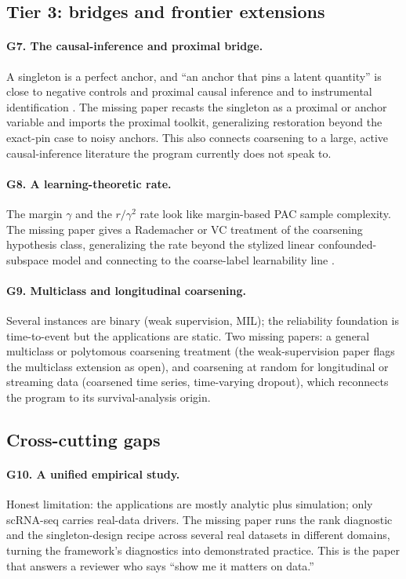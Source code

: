 \documentclass[11pt]{article}
\begin{document}
\subsection{Tier 3: bridges and frontier extensions}

\paragraph{G7. The causal-inference and proximal bridge.}
A singleton is a perfect anchor, and ``an anchor that pins a latent quantity'' is
close to negative controls and proximal causal inference \citep{miao2018identifying}
and to instrumental identification \citep{neweypowell2003instrumental}. The missing
paper recasts the singleton as a
proximal or anchor variable and imports the proximal toolkit, generalizing
restoration beyond the exact-pin case to noisy anchors. This also connects coarsening
to a large, active causal-inference literature the program currently does not speak
to.

\paragraph{G8. A learning-theoretic rate.}
The margin $\gamma$ and the $r/\gamma^2$ rate look like margin-based PAC sample
complexity. The missing paper gives a Rademacher or VC treatment of the coarsening
hypothesis class, generalizing the rate beyond the stylized linear confounded-subspace
model and connecting to the coarse-label learnability line
\citep{fotakis2021efficient, kalavasis2026mean}.

\paragraph{G9. Multiclass and longitudinal coarsening.}
Several instances are binary (weak supervision, MIL); the reliability foundation is
time-to-event but the applications are static. Two missing papers: a general
multiclass or polytomous coarsening treatment (the weak-supervision paper flags the
multiclass extension as open), and coarsening at random for longitudinal or
streaming data (coarsened time series, time-varying dropout), which reconnects the
program to its survival-analysis origin.

\subsection{Cross-cutting gaps}

\paragraph{G10. A unified empirical study.}
Honest limitation: the applications are mostly analytic plus simulation; only
scRNA-seq carries real-data drivers. The missing paper runs the rank diagnostic and
the singleton-design recipe across several real datasets in different domains,
turning the framework's diagnostics into demonstrated practice. This is the paper
that answers a reviewer who says ``show me it matters on data.''
\end{document}

